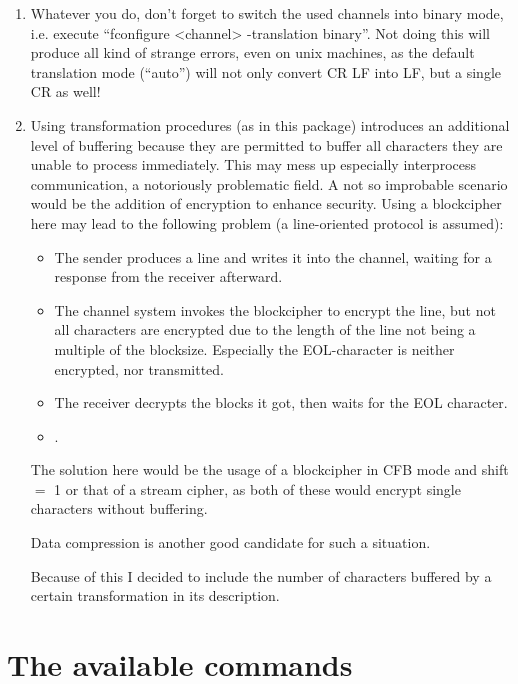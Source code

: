 \begin {enumerate}
\item	Whatever you do, don't forget to switch the used channels into
	binary mode, i.e. execute ``fconfigure <channel> -translation
	binary''. Not doing this will produce all kind of strange
	errors, even on unix machines, as the default translation mode
	(``auto'') will not only convert CR LF into LF, but a single
	CR as well!

\item	Using transformation procedures (as in this package)
	introduces an additional level of buffering because they are
	permitted to buffer all characters they are unable to process
	immediately. This may mess up especially
	interprocess communication, a notoriously problematic field. A
	not so improbable scenario would be the addition of encryption
	to enhance security. Using a blockcipher here may lead to the
	following problem (a line-oriented protocol is assumed):

	\begin {itemize}
	\item	The sender produces a line and writes it into the channel,
		waiting for a response from the receiver afterward.
	\item	The channel system invokes the blockcipher to encrypt
		the line, but not all characters are encrypted due to
		the length of the line not being a multiple of the
		blocksize. Especially the EOL-character is neither
		encrypted, nor transmitted.
	\item	The receiver decrypts the blocks it got, then waits
		for the EOL character.
	\item	{}.
	\end   {itemize}

	The solution here would be the usage of a blockcipher in CFB
	mode and shift $=$ 1 or that of a stream cipher, as both of these
	would encrypt single characters without buffering.

	Data compression is another good candidate for such a situation.

	Because of this I decided to include the number of characters
	buffered by a certain transformation in its description.

\end   {enumerate}


\chapter {The available commands}

